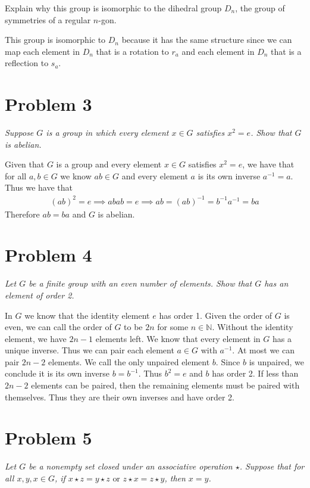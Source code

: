 \documentclass{article}
\theoremstyle{plain} %
\theoremstyle{definition} %
\begin{document}
\noindent{} Explain why this group is isomorphic to the dihedral group
$D_n$, the group of symmetries of a regular $n$-gon.

This group is isomorphic to $D_n$ because it has the same structure since
we can map each element in $D_n$ that is a rotation to $r_a$ and each element in $D_n$ that is a reflection to $s_a$.


\section*{Problem 3}
\noindent\textit{Suppose $G$ is a group in which every element $x\in
G$ satisfies $x^2 = e$. Show that $G$ is abelian.}

Given that $G$ is a group and every element $x \in G$ satisfies $x^2 = e$, we have that
for all $a,b \in G$ we know $ab \in G$ and every element $a$ is its own inverse $a^{-1} = a$. Thus we have that
\begin{align*}
    (ab)^2 = e \implies abab = e \implies ab = (ab)^{-1} = b^{-1}a^{-1} = ba
\end{align*}
Therefore $ab = ba$ and $G$ is abelian.

\section*{Problem 4}
\noindent\textit{Let $G$ be a finite group with an even number of elements.
Show that $G$ has an element of order 2.}

In $G$ we know that the identity element $e$ has order 1. Given the order of $G$ is even, we can call the
order of $G$ to be $2n$ for some $n \in \mathbb{N}$. Without the identity element, we have $2n-1$ elements left.
We know that every element in $G$ has a unique inverse. Thus we can pair each element $a \in G$ with $a^{-1}$.
At most we can pair $2n-2$ elements. We call the only unpaired element $b$. Since $b$ is unpaired,
we conclude it is its own inverse $b = b^{-1}$. Thus $b^2 = e$ and $b$ has order 2. If less than $2n-2$ elements 
can be paired, then the remaining elements must be paired with themselves. Thus they are their own inverses and have order 2.

\section*{Problem 5}
\noindent\textit{Let $G$ be a nonempty set closed under an associative operation $\star$.
Suppose that for all $x,y,x \in G$, if $x \star z = y \star z \text{ or } z \star x = z \star y$, then $x = y$.}
\end{document}

